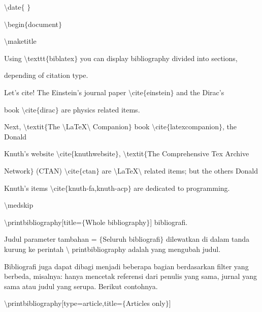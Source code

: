 \begin{itemize}
$\setminus$date$ \{ $ $ \} $\par

$\setminus$begin$ \{ $document$ \} $\par

$\setminus$maketitle\par

Using $\setminus$texttt$ \{ $biblatex$ \} $ you can display bibliography divided into sections, \par

depending of citation type. \par

Let's cite! The Einstein's journal paper $\setminus$cite$ \{ $einstein$ \} $ and the Dirac's \par

book $\setminus$cite$ \{ $dirac$ \} $ are physics related items. \par

Next, $\setminus$textit$ \{ $The $\setminus$LaTeX$\setminus$ Companion$ \} $ book $\setminus$cite$ \{ $latexcompanion$ \} $, the Donald \par

Knuth's website $\setminus$cite$ \{ $knuthwebsite$ \} $, $\setminus$textit$ \{ $The Comprehensive Tex Archive \par

Network$ \} $ (CTAN) $\setminus$cite$ \{ $ctan$ \} $ are $\setminus$LaTeX$\setminus$ related items; but the others Donald \par

Knuth's items $\setminus$cite$ \{ $knuth-fa,knuth-acp$ \} $ are dedicated to programming. \par

$\setminus$medskip \par

$\setminus$printbibliography[title=$ \{ $Whole bibliography$ \} $] bibliografi.\par

Judul parameter tambahan = $ \{ $Seluruh bibliografi$ \} $ dilewatkan di dalam tanda kurung ke perintah $\setminus$ printbibliography adalah yang mengubah judul.\par

Bibliografi juga dapat dibagi menjadi beberapa bagian berdasarkan filter yang berbeda, misalnya: hanya mencetak referensi dari penulis yang sama, jurnal yang sama atau judul yang serupa. Berikut contohnya.\par

$\setminus$printbibliography[type=article,title=$ \{ $Articles only$ \} $]\par


\end{itemize}
